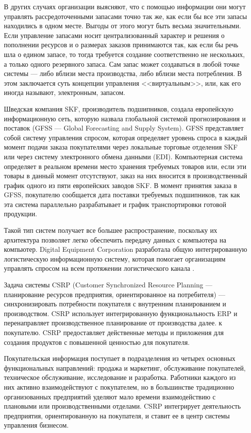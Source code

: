 В других случаях организации выясняют, что с помощью информации они могут управлять рассредоточенными запасами точно так же, как если бы все эти запасы находились в одном месте.
Выгоды от этого могут быть весьма значительными.
Если управление запасами носит централизованный характер и решения о пополнении ресурсов и о размерах заказов принимаются так, как если бы речь шла о едином запасе, то тогда требуется создание соответственно не нескольких, а только одного резервного запаса.
Сам запас может создаваться в любой точке системы --- либо вблизи места производства, либо вблизи места потребления.
В этом заключается суть концепции управления <<виртуальным>>, или, как его иногда называют, электронным, запасом.

Шведская компания SKF, производитель подшипников, создала европейскую информационную сеть, которую назвала глобальной системой прогнозирования и поставок (GFSS --- Global Forecasting and Supply System).
GFSS представляет собой систему управления спросом, которая определяет уровень спроса в каждый момент подачи заказа покупателями через локальные торговые отделения SKF или через систему электронного обмена данными (EDI).
Компьютерная система определяет в реальном времени место хранения требуемых товаров или, если эти товары в данный момент отсутствуют, заказ на них вносится в производственный график одного из пяти европейских заводов SKF.
В момент принятия заказа в GFSS, покупателю сообщается дата поставки требуемых подшипников, так как эта система параллельно разрабатывает и график транспортировки готовой продукции.

Такой тип систем получает все большее распространение, поскольку их архитектура позволяет легко обеспечить передачу данных с компьютера на компьютер.
Digital Equipment Corporation разработала общую интегрированную логистическую информационную систему, которая помогает организациям управлять спросом на всем протяжении логистического канала \cite[с. 225--228]{christopher}.

Задача системы CSRP (Customer Synchronized Resource Planning --- планирование ресурсов предприятия, ориентированное на потребителя) --- синхронизировать потребности покупателя с внутренним планированием и производством.
CSRP использует интегрированную функциональность ERP и перенаправляет производственное планирование от производства далее. к покупателю.
CSRP предоставляет действенные методы и приложения для создания продуктов с повышенной ценностью для покупателя.

Покупательская информация поступает в подразделения из четырех основных функциональных направлений: продажа и маркетинг, обслуживание покупателей, техническое обслуживание, исследование и разработка.
Работники каждого из них активно взаимодействуют с покупателем, но в большинстве традиционно организованных предприятий уделяют мало времени взаимодействию с плановыми или производственными отделами.
CSRP интегрирует деятельность предприятия, ориентированную на покупателя, и ставит ее в центр системы управления бизнесом.

